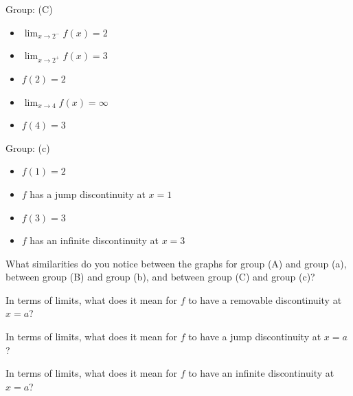 \documentclass[10pt]{article}
\begin{document}
%
%
\vfill
%
%
\begin{minipage}[t][2in]{0.45\textwidth}
Group: (C)
    \begin{itemize}
    \item $\displaystyle\lim_{x\to2^-}f(x)=2$
    \item $\displaystyle\lim_{x\to2^+}f(x)=3$
    \item $f(2)=2$
    \item $\displaystyle\lim_{x\to4}f(x)=\infty$
    \item $f(4)=3$\\
    \end{itemize}
\end{minipage}
%
\hfill
%
\begin{minipage}[t][2in]{0.45\textwidth}
Group: (c)
    \begin{itemize}
    \item $f(1)=2$
    \item $f$ has a jump discontinuity at $x=1$
    \item $f(3)=3$
    \item $f$ has an infinite discontinuity at $x=3$
    \end{itemize}
\end{minipage}
%
%
\vfill
%
%

\newpage%

What similarities do you notice between the graphs for group (A) and group (a), between group (B) and group (b), and between group (C) and group (c)?

\vfill

In terms of limits, what does it mean for $f$ to have a removable discontinuity at $x=a$?

\vfill

In terms of limits, what does it mean for $f$ to have a jump discontinuity at $x=a$?

\vfill

In terms of limits, what does it mean for $f$ to have an infinite discontinuity at $x=a$?

\vfill
\end{document}
